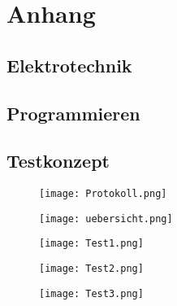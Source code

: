 \section{Anhang} \label{sec:anhang}


\subsection{Elektrotechnik} \label{subsec:eltech}








\subsection{Programmieren} \label{subsec:softech}



\subsection{Testkonzept} \label{subsec:eltech}
\begin{figure}[H]
	\centering
	\texttt{[image: Protokoll.png]}
	\label{fig:Protokoll}
\end{figure}

\begin{figure}[H]
	\centering
	\texttt{[image: uebersicht.png]}
	\label{fig:übersicht}
\end{figure}

\begin{figure}[H]
	\centering
	\texttt{[image: Test1.png]}
	\label{fig:Test1}
\end{figure}

\begin{figure}[H]
	\centering
	\texttt{[image: Test2.png]}
	\label{fig:Test2}
\end{figure}

\begin{figure}[H]
	\centering
	\texttt{[image: Test3.png]}
	\label{fig:Test3}
\end{figure}

